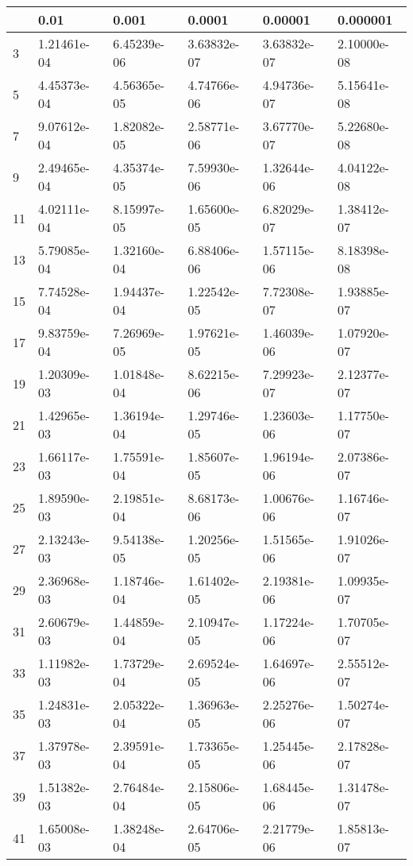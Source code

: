 \documentclass{article}
\begin{document}
\begin{table}[H]
\centering
\begin{tabular}{|l|l|l|l|l|l|}
\hline
& 0.01 & 0.001 & 0.0001 & 0.00001 & 0.000001 \\ \hline
3 & 1.21461e-04 & 6.45239e-06 & 3.63832e-07 & 3.63832e-07 & 2.10000e-08 \\ \hline
5 & 4.45373e-04 & 4.56365e-05 & 4.74766e-06 & 4.94736e-07 & 5.15641e-08 \\ \hline
7 & 9.07612e-04 & 1.82082e-05 & 2.58771e-06 & 3.67770e-07 & 5.22680e-08 \\ \hline
9 & 2.49465e-04 & 4.35374e-05 & 7.59930e-06 & 1.32644e-06 & 4.04122e-08 \\ \hline
11 & 4.02111e-04 & 8.15997e-05 & 1.65600e-05 & 6.82029e-07 & 1.38412e-07 \\ \hline
13 & 5.79085e-04 & 1.32160e-04 & 6.88406e-06 & 1.57115e-06 & 8.18398e-08 \\ \hline
15 & 7.74528e-04 & 1.94437e-04 & 1.22542e-05 & 7.72308e-07 & 1.93885e-07 \\ \hline
17 & 9.83759e-04 & 7.26969e-05 & 1.97621e-05 & 1.46039e-06 & 1.07920e-07 \\ \hline
19 & 1.20309e-03 & 1.01848e-04 & 8.62215e-06 & 7.29923e-07 & 2.12377e-07 \\ \hline
21 & 1.42965e-03 & 1.36194e-04 & 1.29746e-05 & 1.23603e-06 & 1.17750e-07 \\ \hline
23 & 1.66117e-03 & 1.75591e-04 & 1.85607e-05 & 1.96194e-06 & 2.07386e-07 \\ \hline
25 & 1.89590e-03 & 2.19851e-04 & 8.68173e-06 & 1.00676e-06 & 1.16746e-07 \\ \hline
27 & 2.13243e-03 & 9.54138e-05 & 1.20256e-05 & 1.51565e-06 & 1.91026e-07 \\ \hline
29 & 2.36968e-03 & 1.18746e-04 & 1.61402e-05 & 2.19381e-06 & 1.09935e-07 \\ \hline
31 & 2.60679e-03 & 1.44859e-04 & 2.10947e-05 & 1.17224e-06 & 1.70705e-07 \\ \hline
33 & 1.11982e-03 & 1.73729e-04 & 2.69524e-05 & 1.64697e-06 & 2.55512e-07 \\ \hline
35 & 1.24831e-03 & 2.05322e-04 & 1.36963e-05 & 2.25276e-06 & 1.50274e-07 \\ \hline
37 & 1.37978e-03 & 2.39591e-04 & 1.73365e-05 & 1.25445e-06 & 2.17828e-07 \\ \hline
39 & 1.51382e-03 & 2.76484e-04 & 2.15806e-05 & 1.68445e-06 & 1.31478e-07 \\ \hline
41 & 1.65008e-03 & 1.38248e-04 & 2.64706e-05 & 2.21779e-06 & 1.85813e-07 \\ \hline

\end{tabular}
\end{table}
\end{document}

